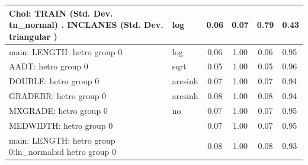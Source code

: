 \begin{table}
\begin{center}
\begin{tabular}{|l|l|c|c|c|l|}
			\hline
			 Chol: TRAIN (Std. Dev. tn_normal) . INCLANES (Std. Dev.   triangular ) & log & 0.06 & 0.07 & 0.79 & 0.43 \\
			\hline
			main: LENGTH: hetro group 0 & log & 0.06 & 1.00 & 0.06 & 0.95 \\
			\hline
			AADT: hetro group 0 & sqrt & 0.05 & 1.00 & 0.05 & 0.96 \\
			\hline
			DOUBLE: hetro group 0 & arcsinh & 0.07 & 1.00 & 0.07 & 0.94 \\
			\hline
			GRADEBR: hetro group 0 & arcsinh & 0.08 & 1.00 & 0.08 & 0.94 \\
			\hline
			MXGRADE: hetro group 0 & no & 0.07 & 1.00 & 0.07 & 0.95 \\
			\hline
			MEDWIDTH: hetro group 0 &  & 0.07 & 1.00 & 0.07 & 0.95 \\
			\hline
			main: LENGTH: hetro group 0:ln_normal:sd  hetro group 0 &  & 0.08 & 1.00 & 0.08 & 0.93 \\
			\hline
		\end{tabular}
	\end{center}
\end{table}